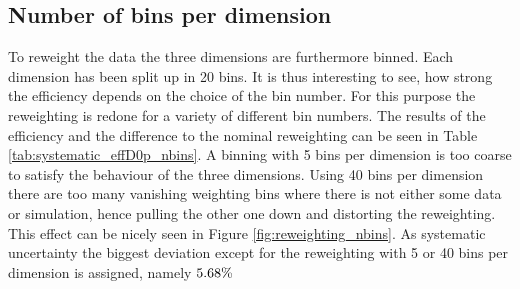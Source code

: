 \subsection{Number of bins per dimension}
To reweight the data the three dimensions are furthermore binned.
Each dimension has been split up in 20 bins.
It is thus interesting to see, how strong the efficiency depends on the choice of the bin number.
For this purpose the reweighting is redone for a variety of different bin numbers.
The results of the efficiency \effDp and the difference to the nominal reweighting can be seen in Table \ref{tab:systematic_effD0p_nbins}.
A binning with 5 bins per dimension is too coarse to satisfy the behaviour of the three dimensions.
Using 40 bins per dimension there are too many vanishing weighting bins where there is not either some data or simulation, hence pulling the other one down and distorting the reweighting.
This effect can be nicely seen in Figure \ref{fig:reweighting_nbins}.
As systematic uncertainty the biggest deviation except for the reweighting with 5 or 40 bins per dimension is assigned, namely $5.68\%$

